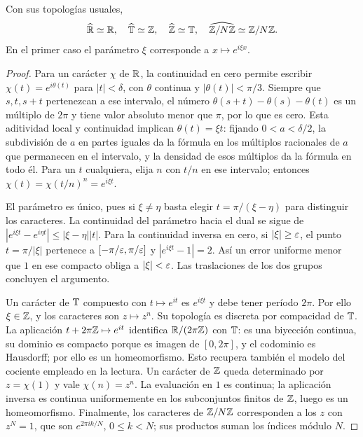 \begin{proposicion}\label{v4:duales-modelos}
Con sus topologías usuales,
\[
 \widehat{\mathbb R}\simeq\mathbb R,\quad \widehat{\mathbb T}\simeq\mathbb Z,\quad
 \widehat{\mathbb Z}\simeq\mathbb T,\quad
 \widehat{\mathbb Z/N\mathbb Z}\simeq\mathbb Z/N\mathbb Z.
\]
En el primer caso el parámetro $\xi$ corresponde a $x\mapsto e^{i\xi x}$.
\end{proposicion}
\begin{proof}
Para un carácter $\chi$ de $\mathbb R$, la continuidad en cero permite escribir $\chi(t)=e^{i\theta(t)}$ para $|t|<\delta$, con $\theta$ continua y $|\theta(t)|<\pi/3$. Siempre que $s,t,s+t$ pertenezcan a ese intervalo, el número $\theta(s+t)-\theta(s)-\theta(t)$ es un múltiplo de $2\pi$ y tiene valor absoluto menor que $\pi$, por lo que es cero. Esta aditividad local y continuidad implican $\theta(t)=\xi t$: fijando $0<a<\delta/2$, la subdivisión de $a$ en partes iguales da la fórmula en los múltiplos racionales de $a$ que permanecen en el intervalo, y la densidad de esos múltiplos da la fórmula en todo él. Para un $t$ cualquiera, elija $n$ con $t/n$ en ese intervalo; entonces $\chi(t)=\chi(t/n)^n=e^{i\xi t}$.

El parámetro es único, pues si $\xi\ne\eta$ basta elegir $t=\pi/(\xi-\eta)$ para distinguir los caracteres. La continuidad del parámetro hacia el dual se sigue de
$|e^{i\xi t}-e^{i\eta t}|\le|\xi-\eta||t|$. Para la continuidad inversa en cero, si $|\xi|\ge\varepsilon$, el punto $t=\pi/|\xi|$ pertenece a $[-\pi/\varepsilon,\pi/\varepsilon]$ y $|e^{i\xi t}-1|=2$. Así un error uniforme menor que $1$ en ese compacto obliga a $|\xi|<\varepsilon$. Las traslaciones de los dos grupos concluyen el argumento.

Un carácter de $\mathbb T$ compuesto con $t\mapsto e^{it}$ es $e^{i\xi t}$ y debe tener período $2\pi$. Por ello $\xi\in\mathbb Z$, y los caracteres son $z\mapsto z^n$. Su topología es discreta por compacidad de $\mathbb T$. La aplicación $t+2\pi\mathbb Z\mapsto e^{it}$ identifica $\mathbb R/(2\pi\mathbb Z)$ con $\mathbb T$: es una biyección continua, su dominio es compacto porque es imagen de $[0,2\pi]$, y el codominio es Hausdorff; por ello es un homeomorfismo. Esto recupera también el modelo del cociente empleado en la lectura. Un carácter de $\mathbb Z$ queda determinado por $z=\chi(1)$ y vale $\chi(n)=z^n$. La evaluación en $1$ es continua; la aplicación inversa es continua uniformemente en los subconjuntos finitos de $\mathbb Z$, luego es un homeomorfismo. Finalmente, los caracteres de $\mathbb Z/N\mathbb Z$ corresponden a los $z$ con $z^N=1$, que son $e^{2\pi i k/N}$, $0\le k<N$; sus productos suman los índices módulo $N$.
\end{proof}


